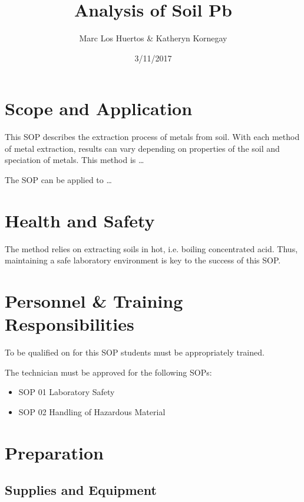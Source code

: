 \documentclass[12pt]{../SOP2}
\title{Analysis of Soil Pb}
\date{3/11/2017}
\author{Marc Los Huertos \& Katheryn Kornegay}
\begin{document}


\maketitle

\section{Scope and Application}

\NP This SOP describes the extraction process of metals from soil. With each method of metal extraction, results can vary depending on properties of the soil and speciation of metals. This method is \ldots

\NP The SOP can be applied to \ldots

\tableofcontents

\newpage

\section{Health and Safety}

\NP The method relies on extracting soils in hot, i.e. boiling concentrated acid. Thus, maintaining a safe laboratory environment is key to the success of this SOP. 


\section{Personnel \& Training Responsibilities}

\NP To be qualified on for this SOP students must be appropriately trained.

The technician must be approved for the following SOPs:

\begin{itemize}
  \item SOP 01 Laboratory Safety
  \item SOP 02 Handling of Hazardous Material
\end{itemize}


\section{Preparation}

\subsection{Supplies and Equipment}
\end{document}
